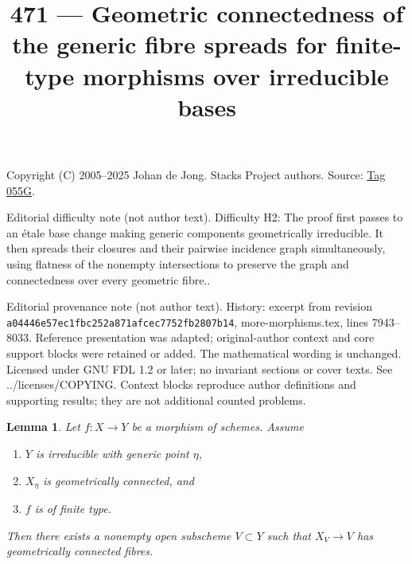\documentclass{amsart}
\theoremstyle{plain}
\newtheorem{lemma}[subsection]{Lemma}
\theoremstyle{definition}
\theoremstyle{remark}
\numberwithin{equation}{subsection}
\begin{document}
\title[Stacks Project, Tag 055G]{471 --- Geometric connectedness of the generic fibre spreads for finite-type morphisms over irreducible bases}
\maketitle
\noindent Copyright (C) 2005--2025 Johan de Jong. Stacks Project authors. Source: \href{https://stacks.math.columbia.edu/tag/055G}{Tag 055G}.

\noindent Editorial difficulty note (not author text). Difficulty H2: The proof first passes to an étale base change making generic components geometrically irreducible. It then spreads their closures and their pairwise incidence graph simultaneously, using flatness of the nonempty intersections to preserve the graph and connectedness over every geometric fibre..

\noindent Editorial provenance note (not author text). History: excerpt from revision \texttt{a0444\allowbreak 6e57e\allowbreak c1fbc\allowbreak 252a8\allowbreak 71afc\allowbreak ec775\allowbreak 2fb28\allowbreak 07b14}, more-morphisms.tex, lines 7943--8033. Reference presentation was adapted; original-author context and core support blocks were retained or added. The mathematical wording is unchanged. Licensed under GNU FDL 1.2 or later; no invariant sections or cover texts. See ../licenses/COPYING. Context blocks reproduce author definitions and supporting results; they are not additional counted problems.

\begin{lemma}
\label{lemma-geometrically-connected-generic-fibre}
Let $f : X \to Y$ be a morphism of schemes.
Assume
\begin{enumerate}
\item $Y$ is irreducible with generic point $\eta$,
\item $X_\eta$ is geometrically connected, and
\item $f$ is of finite type.
\end{enumerate}
Then there exists a nonempty open subscheme $V \subset Y$
such that $X_V \to V$ has geometrically connected fibres.
\end{lemma}
\end{document}
